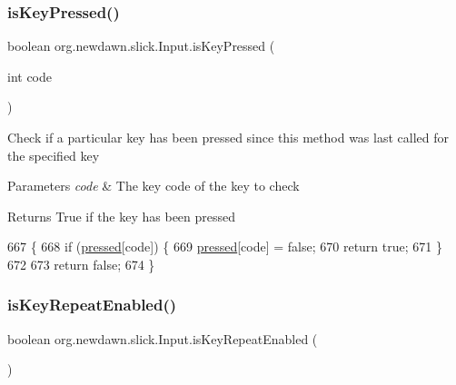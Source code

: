 \subsubsection{\texorpdfstring{is\+Key\+Pressed()}{isKeyPressed()}}
{\footnotesize\ttfamily boolean org.\+newdawn.\+slick.\+Input.\+is\+Key\+Pressed (\begin{DoxyParamCaption}\item[{int}]{code }\end{DoxyParamCaption})\hspace{0.3cm}{\ttfamily [inline]}}

Check if a particular key has been pressed since this method was last called for the specified key


\begin{DoxyParams}{Parameters}
{\em code} & The key code of the key to check \\
\hline
\end{DoxyParams}
\begin{DoxyReturn}{Returns}
True if the key has been pressed 
\end{DoxyReturn}

\begin{DoxyCode}
667                                           \{
668         \textcolor{keywordflow}{if} (\mbox{\hyperlink{classorg_1_1newdawn_1_1slick_1_1_input_a3cc93977afce568be4f0f9dbb43fe722}{pressed}}[code]) \{
669             \mbox{\hyperlink{classorg_1_1newdawn_1_1slick_1_1_input_a3cc93977afce568be4f0f9dbb43fe722}{pressed}}[code] = \textcolor{keyword}{false};
670             \textcolor{keywordflow}{return} \textcolor{keyword}{true};
671         \}
672         
673         \textcolor{keywordflow}{return} \textcolor{keyword}{false};
674     \}
\end{DoxyCode}
\mbox{\label{classorg_1_1newdawn_1_1slick_1_1_input_a81051ce61287d26d30ee47a0af2a08eb}} 
\subsubsection{\texorpdfstring{is\+Key\+Repeat\+Enabled()}{isKeyRepeatEnabled()}}
{\footnotesize\ttfamily boolean org.\+newdawn.\+slick.\+Input.\+is\+Key\+Repeat\+Enabled (\begin{DoxyParamCaption}{ }\end{DoxyParamCaption})\hspace{0.3cm}{\ttfamily [inline]}}

